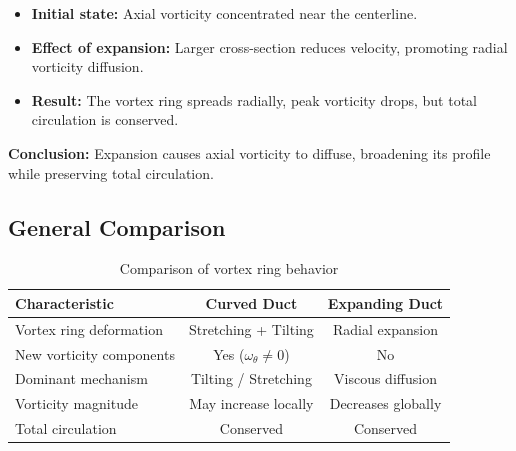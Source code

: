 \documentclass{article}
\begin{document}
\begin{itemize}
    \item \textbf{Initial state:} Axial vorticity concentrated near the centerline.
    \item \textbf{Effect of expansion:} Larger cross-section reduces velocity, promoting radial vorticity diffusion.
    \item \textbf{Result:} The vortex ring spreads radially, peak vorticity drops, but total circulation is conserved.
\end{itemize}

\textbf{Conclusion:} Expansion causes axial vorticity to diffuse, broadening its profile while preserving total circulation.

\vspace{0.5cm}
\subsection*{General Comparison}

\begin{table}[h]
\centering
\begin{tabular}{|l|c|c|}
\hline
\textbf{Characteristic} & \textbf{Curved Duct} & \textbf{Expanding Duct} \\ \hline
Vortex ring deformation & Stretching + Tilting & Radial expansion \\ \hline
New vorticity components & Yes ($\omega_\theta \neq 0$) & No \\ \hline
Dominant mechanism & Tilting / Stretching & Viscous diffusion \\ \hline
Vorticity magnitude & May increase locally & Decreases globally \\ \hline
Total circulation & Conserved & Conserved \\ \hline
\end{tabular}
\caption{Comparison of vortex ring behavior}
\end{table}
\end{document}
